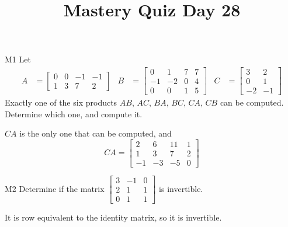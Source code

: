 \documentclass{sbgLAquiz}
\title{Mastery Quiz Day 28 }
\begin{document}
\begin{problem}{M1}
Let 
\begin{align*}
A &= \begin{bmatrix} 0 & 0 & -1 & -1 \\ 1 & 3 & 7 & 2 \end{bmatrix} & B &= \begin{bmatrix} 0 & 1 & 7 & 7 \\ -1 & -2 & 0 & 4 \\ 0 & 0 & 1 & 5 \end{bmatrix} & C&=\begin{bmatrix} 3 & 2 \\ 0 & 1 \\ -2 & -1 \end{bmatrix}
\end{align*}
Exactly one of the six products $AB$, $AC$, $BA$, $BC$, $CA$, $CB$ can be computed.  Determine which one, and compute it.
\end{problem}
\begin{solution}
$CA$ is the only one that can be computed, and 
$$CA = \begin{bmatrix} 2 & 6 & 11 & 1 \\ 1 & 3 & 7 & 2 \\ -1 & -3 & -5 & 0 \end{bmatrix}$$
\end{solution}



\begin{problem}{M2}
Determine if the matrix $\begin{bmatrix} 3 & -1 & 0  \\ 2 & 1 & 1  \\ 0 & 1 & 1   \end{bmatrix}$ is invertible.
\end{problem}
\begin{solution}
It is row equivalent to the identity matrix, so it is invertible.
\end{solution}
\end{document}
